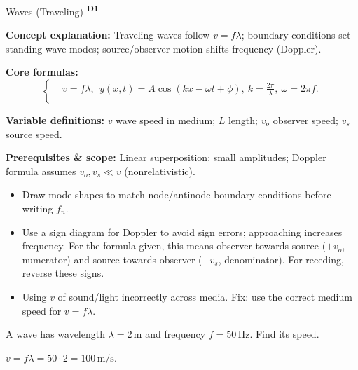 ﻿\documentclass[12pt,a4paper]{article}
\providecommand{\KPFormulas}{}
\providecommand{\KPHeuristics}{}
\providecommand{\KPProblems}{}
\newcommand{\DOne}{\texorpdfstring{\textsuperscript{\textbf{D1}}}{ D1}}
\begin{document}
\begin{KnowledgePoint}{Waves (Traveling) \DOne}
  \KPFormulas
  \begin{formulabox}
  \textbf{Concept explanation:} Traveling waves follow $v=f\lambda$; boundary conditions set standing-wave modes; source/observer motion shifts frequency (Doppler).

  \textbf{Core formulas:}
  \[
  \left\{\begin{aligned}
    &v=f\lambda,\ \ y(x,t)=A\cos(kx-\omega t+\phi),\ k=\tfrac{2\pi}{\lambda},\ \omega=2\pi f.\\
  \end{aligned}\right.
  \]

  \textbf{Variable definitions:} $v$ wave speed in medium; $L$ length; $v_o$ observer speed; $v_s$ source speed.

  \textbf{Prerequisites \& scope:} Linear superposition; small amplitudes; Doppler formula assumes $v_o,v_s\ll v$ (nonrelativistic).
  \end{formulabox}

  \KPHeuristics
  \begin{heuristicsbox}
  \begin{itemize}[leftmargin=*]
    \item Draw mode shapes to match node/antinode boundary conditions before writing $f_n$.
    \item Use a sign diagram for Doppler to avoid sign errors; approaching increases frequency. For the formula given, this means observer towards source ($+v_o$, numerator) and source towards observer ($-v_s$, denominator). For receding, reverse these signs.
  \end{itemize}
  \vspace{0.4em}
  \begin{itemize}[leftmargin=*]
    \item Using $v$ of sound/light incorrectly across media. Fix: use the correct medium speed for $v=f\lambda$.
  \end{itemize}
  \end{heuristicsbox}

  \KPProblems
  \begin{cheatproblem}
  A wave has wavelength $\lambda=2\,\text{m}$ and frequency $f=50\,\text{Hz}$. Find its speed.
  \begin{solutionbox}
  $v=f\lambda=50\cdot2=100\,\text{m/s}$.
  \end{solutionbox}
  \end{cheatproblem}
\end{KnowledgePoint}
\end{document}
